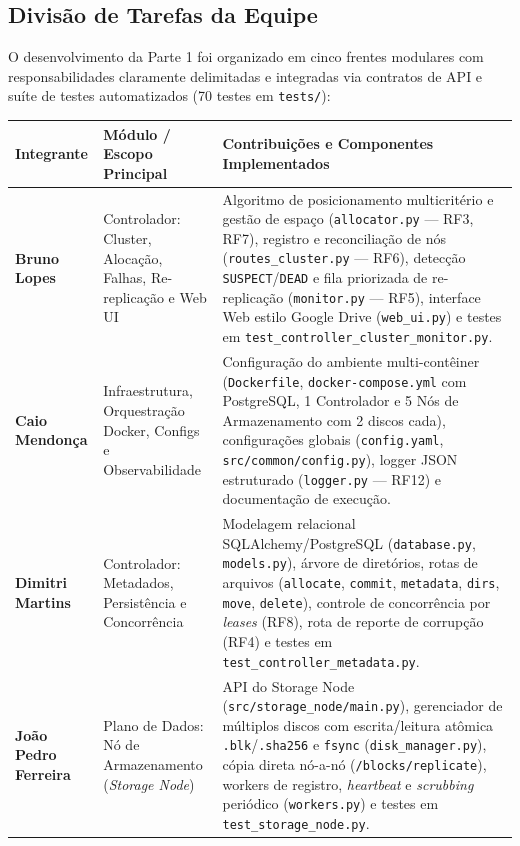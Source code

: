 \documentclass[10pt,a4paper]{article}
\begin{document}
\subsection{Divisão de Tarefas da Equipe}
O desenvolvimento da Parte 1 foi organizado em cinco frentes modulares com responsabilidades claramente delimitadas e integradas via contratos de API e suíte de testes automatizados (70 testes em \texttt{tests/}):

\begin{table}[!htbp]
\centering
\footnotesize
\renewcommand{\arraystretch}{1.15}
\begin{tabularx}{\textwidth}{l p{5.2cm} Y}
\toprule
\textbf{Integrante} & \textbf{Módulo / Escopo Principal} & \textbf{Contribuições e Componentes Implementados} \\
\midrule
\textbf{Bruno Lopes} & Controlador: Cluster, Alocação, Falhas, Re-replicação e Web UI & Algoritmo de posicionamento multicritério e gestão de espaço (\texttt{allocator.py} — RF3, RF7), registro e reconciliação de nós (\texttt{routes\_cluster.py} — RF6), detecção \texttt{SUSPECT}/\texttt{DEAD} e fila priorizada de re-replicação (\texttt{monitor.py} — RF5), interface Web estilo Google Drive (\texttt{web\_ui.py}) e testes em \texttt{test\_controller\_cluster\_monitor.py}. \\
\textbf{Caio Mendonça} & Infraestrutura, Orquestração Docker, Configs e Observabilidade & Configuração do ambiente multi-contêiner (\texttt{Dockerfile}, \texttt{docker-compose.yml} com PostgreSQL, 1 Controlador e 5 Nós de Armazenamento com 2 discos cada), configurações globais (\texttt{config.yaml}, \texttt{src/common/config.py}), logger JSON estruturado (\texttt{logger.py} — RF12) e documentação de execução. \\
\textbf{Dimitri Martins} & Controlador: Metadados, Persistência e Concorrência & Modelagem relacional SQLAlchemy/PostgreSQL (\texttt{database.py}, \texttt{models.py}), árvore de diretórios, rotas de arquivos (\texttt{allocate}, \texttt{commit}, \texttt{metadata}, \texttt{dirs}, \texttt{move}, \texttt{delete}), controle de concorrência por \textit{leases} (RF8), rota de reporte de corrupção (RF4) e testes em \texttt{test\_controller\_metadata.py}. \\
\textbf{João Pedro Ferreira} & Plano de Dados: Nó de Armazenamento (\textit{Storage Node}) & API do Storage Node (\texttt{src/storage\_node/main.py}), gerenciador de múltiplos discos com escrita/leitura atômica \texttt{.blk}/\texttt{.sha256} e \texttt{fsync} (\texttt{disk\_manager.py}), cópia direta nó-a-nó (\texttt{/blocks/replicate}), workers de registro, \textit{heartbeat} e \textit{scrubbing} periódico (\texttt{workers.py}) e testes em \texttt{test\_storage\_node.py}. \\

\end{tabularx}
\end{table}
\end{document}
